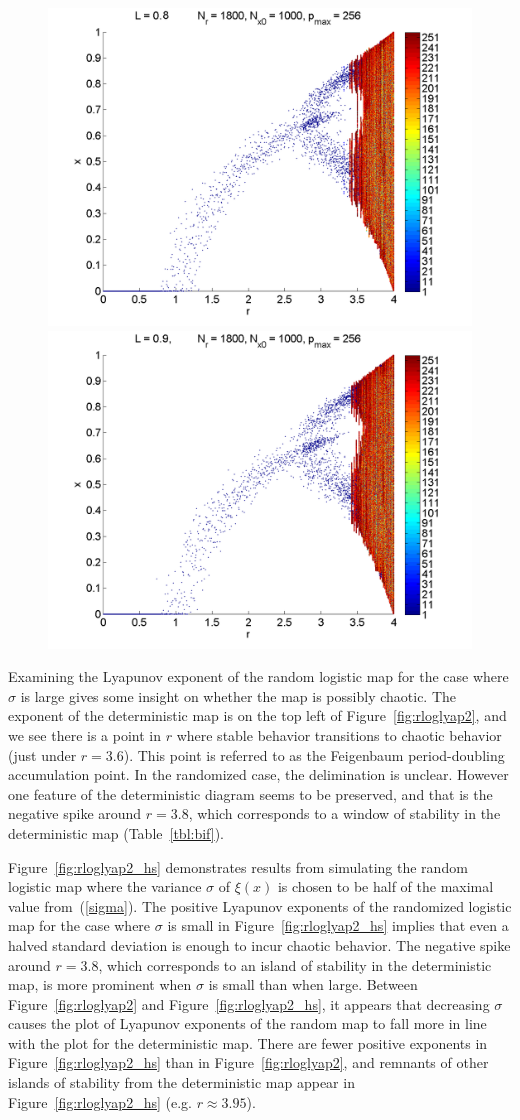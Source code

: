 \begin{figure}[H]
\begin{center}
		\includegraphics[width=.5\textwidth]{figs/rlog_bif_halfs_L_08.png}\hfill
		\includegraphics[width=.5\textwidth]{figs/rlog_bif_halfs_L_09.png}\\
	\end{center}
\end{figure}

Examining the Lyapunov exponent of the random logistic
map for the case where $\sigma$ is large gives some insight on whether
the map is possibly chaotic. The exponent of the deterministic map is
on the top left of Figure~\ref{fig:rloglyap2}, and we see there is a
point in $r$ where stable behavior transitions to chaotic behavior
(just under $r=3.6$). This point is referred to as the Feigenbaum
period-doubling accumulation point. In the randomized case, the
delimination is unclear. However one feature of the deterministic
diagram seems to be preserved, and that is the negative spike around
$r=3.8$, which corresponds to a window of stability in the
deterministic map (Table~\ref{tbl:bif}).

Figure~\ref{fig:rloglyap2_hs}
demonstrates results from simulating the random logistic map where the
variance $\sigma$ of $\xi(x)$ is chosen to be half of the maximal
value from~(\ref{sigma}). The positive Lyapunov exponents of the randomized logistic
map for the case where $\sigma$ is small in
Figure~\ref{fig:rloglyap2_hs} implies that even a halved standard
deviation is enough to incur chaotic behavior. The negative spike around
$r=3.8$, which corresponds to an island of stability in the
deterministic map, is more prominent when $\sigma$ is small than when large. Between
Figure~\ref{fig:rloglyap2} and Figure~\ref{fig:rloglyap2_hs}, it
appears that decreasing $\sigma$ causes the plot of Lyapunov exponents
of the random map to fall more in line with the plot for the
deterministic map. There are fewer positive exponents in
Figure~\ref{fig:rloglyap2_hs} than in Figure~\ref{fig:rloglyap2}, and
remnants of other islands of stability from the deterministic map
appear in Figure~\ref{fig:rloglyap2_hs} (e.g. $r \approx 3.95$).

